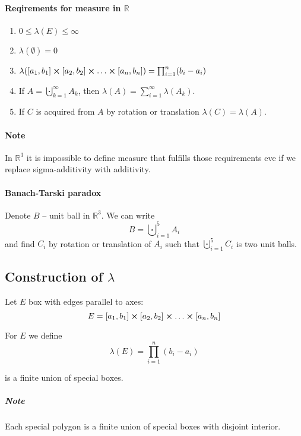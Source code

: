 \paragraph{Reqirements for measure in $\mathbb{R}$}

\begin{enumerate}
	\item $0\leq \lambda(E) \leq \infty$
	\item $\lambda(\emptyset) = 0$
	\item $\lambda(\qty[a_1,b_1]\cross\qty[a_2,b_2]\cross\dots\cross \qty[a_n,b_n]) = \prod_{i=1}^n (b_i-a_i)$
	\item If $A = \bigcupdot_{k=1}^\infty A_k$, then $\lambda(A) = \sum_{i=1}^\infty \lambda(A_k)$.
	\item If $C$ is acquired from $A$ by rotation or translation $\lambda(C) = \lambda(A)$.
\end{enumerate}
\paragraph{Note} In $\mathbb{R}^3$ it is impossible to define measure that fulfills those requirements eve if we replace sigma-additivity with additivity.
\paragraph{Banach-Tarski paradox} Denote $B$ -- unit ball in $\mathbb{R}^3$. We can write 
$$B = \bigcupdot_{i=1}^5 A_i$$
and find $C_i$ by rotation or translation of $A_i$ such that $\bigcupdot_{i=1}^5 C_i$ is two unit balls.

\begin{center}
	
\end{center}
\subsection{Construction of $\lambda$}
\begin{definition}
	Let $E$ box with edges parallel to axes:
	$$E = \qty[a_1,b_1]\cross\qty[a_2,b_2]\cross\dots\cross \qty[a_n,b_n]$$
	
	For $E$ we define 
	$$\lambda(E) = \prod_{i=1}^n (b_i-a_i)$$
\end{definition}
 
 \begin{definition} is a finite union of special boxes. 
 \end{definition}
 \subparagraph{Note} Each special polygon is a finite union of special boxes with disjoint interior.
 
